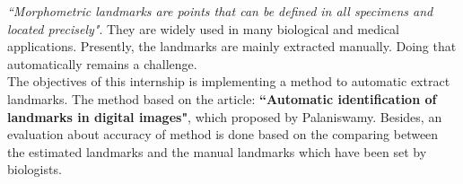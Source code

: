 \textit{``Morphometric landmarks are points that can be defined in all specimens  and located precisely"}\cite{palaniswamy2010automatic}. They are widely used in many biological and medical applications. Presently, the landmarks are mainly extracted manually. Doing that automatically remains a challenge.\\[0.2cm]
The objectives of this internship is implementing a method to automatic extract landmarks. The method based on the article: \textbf{``Automatic identification of landmarks in digital images"}, which proposed by Palaniswamy\cite{palaniswamy2010automatic}. Besides, an evaluation about accuracy of method is done based on the comparing between the estimated landmarks and the manual landmarks which have been set by biologists.